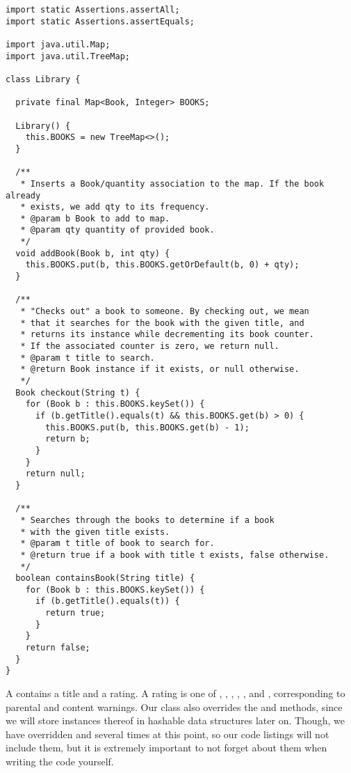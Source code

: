 \begin{lstlisting}[language=MyJava]
import static Assertions.assertAll;
import static Assertions.assertEquals;

import java.util.Map;
import java.util.TreeMap;

class Library {

  private final Map<Book, Integer> BOOKS;

  Library() {
    this.BOOKS = new TreeMap<>();
  }

  /**
   * Inserts a Book/quantity association to the map. If the book already
   * exists, we add qty to its frequency.
   * @param b Book to add to map.
   * @param qty quantity of provided book.
   */
  void addBook(Book b, int qty) {
    this.BOOKS.put(b, this.BOOKS.getOrDefault(b, 0) + qty);
  }

  /**
   * "Checks out" a book to someone. By checking out, we mean
   * that it searches for the book with the given title, and
   * returns its instance while decrementing its book counter.
   * If the associated counter is zero, we return null.
   * @param t title to search.
   * @return Book instance if it exists, or null otherwise.
   */
  Book checkout(String t) {
    for (Book b : this.BOOKS.keySet()) {
      if (b.getTitle().equals(t) && this.BOOKS.get(b) > 0) {
        this.BOOKS.put(b, this.BOOKS.get(b) - 1);
        return b;
      }
    }
    return null;
  }

  /** 
   * Searches through the books to determine if a book
   * with the given title exists.
   * @param t title of book to search for.
   * @return true if a book with title t exists, false otherwise.
   */
  boolean containsBook(String title) {
    for (Book b : this.BOOKS.keySet()) {
      if (b.getTitle().equals(t)) {
        return true;
      }
    }
    return false;
  }
}
\end{lstlisting}

A  contains a title and a rating. 
A rating is one of , , , , , and , corresponding to parental and content warnings.
Our  class also overrides the  and  methods, since we will store instances thereof in hashable data structures later on.
Though, we have overridden  and  several times at this point, so our code listings will not include them, but it is extremely important to not forget about them when writing the code yourself.

